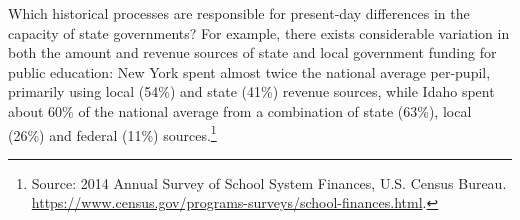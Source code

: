 
Which historical processes are responsible for present-day differences in the capacity of state governments? For example, there exists considerable variation in both the amount and revenue sources of state and local government funding for public education: New York spent almost twice the national average per-pupil, primarily using local (54\%) and state (41\%) revenue sources, while Idaho spent about 60\% of the national average from a combination of state (63\%), local (26\%) and federal (11\%) sources.\footnote{Source: 2014 Annual Survey of School System Finances, U.S. Census Bureau. \url{https://www.census.gov/programs-surveys/school-finances.html}.}



